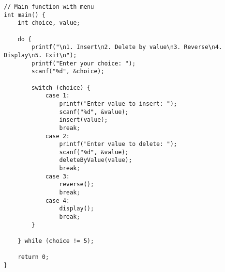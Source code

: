 \documentclass[12pt,a4paper]{article}
\begin{document}
\begin{lstlisting}
// Main function with menu
int main() {
    int choice, value;

    do {
        printf("\n1. Insert\n2. Delete by value\n3. Reverse\n4. Display\n5. Exit\n");
        printf("Enter your choice: ");
        scanf("%d", &choice);

        switch (choice) {
            case 1:
                printf("Enter value to insert: ");
                scanf("%d", &value);
                insert(value);
                break;
            case 2:
                printf("Enter value to delete: ");
                scanf("%d", &value);
                deleteByValue(value);
                break;
            case 3:
                reverse();
                break;
            case 4:
                display();
                break;
        }

    } while (choice != 5);

    return 0;
}
\end{lstlisting}

\newpage
\end{document}

